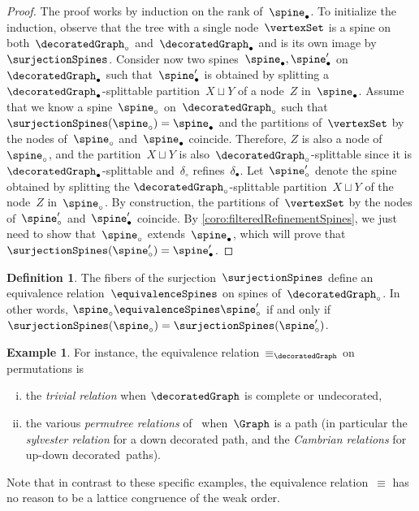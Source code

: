 \documentclass{amsart}
\theoremstyle{definition}
\newtheorem{definition}[theorem]{Definition}
\newtheorem{example}[theorem]{Example}
\newcommand{\darkblue}{\color{darkblue}} %
\newcommand{\defn}[1]{\textsl{\darkblue #1}} %
\newcommand{\vincent}[1]{\todo[color=blue!30]{#1 \\ \hfill --- V.}}
\newcommand{\decoration}{\delta}
\begin{document}
\begin{proof}
  The proof works by induction on the rank of~$\spine_\bullet$.
  To initialize the induction, observe that the tree with a single node~$\vertexSet$ is a spine on both~$\decoratedGraph_\circ$ and~$\decoratedGraph_\bullet$ and is its own image by~$\surjectionSpines$.
  Consider now two spines~$\spine_\bullet, \spine_\bullet'$ on~$\decoratedGraph_\bullet$ such that~$\spine_\bullet'$ is obtained by splitting a $\decoratedGraph_\bullet$-splittable partition~$X \sqcup Y$ of a node~$Z$ in~$\spine_\bullet$.
  Assume that we know a spine~$\spine_\circ$ on~$\decoratedGraph_\circ$ such that~${\surjectionSpines(\spine_\circ) = \spine_\bullet}$ and the partitions of~$\vertexSet$ by the nodes of~$\spine_\circ$ and~$\spine_\bullet$ coincide.
  Therefore, $Z$ is also a node of~$\spine_\circ$, and the partition~$X \sqcup Y$ is also~$\decoratedGraph_\circ$-splittable since it is $\decoratedGraph_\bullet$-splittable and~$\decoration_\circ$ refines~$\decoration_\bullet$.
  Let~$\spine_\circ'$ denote the spine obtained by splitting the  $\decoratedGraph_\circ$-splittable partition~$X \sqcup Y$ of the node~$Z$ in~$\spine_\circ$.
  By construction, the partitions of~$\vertexSet$ by the nodes of~$\spine_\circ'$ and~$\spine_\bullet'$ coincide.
  By \cref{coro:filteredRefinementSpines}, we just need to show that~$\spine_\circ$ extends~$\spine_\bullet$, which will prove that~${\surjectionSpines(\spine_\circ') = \spine_\bullet'}$.
  \vincent{todo}
\end{proof}

\begin{definition}
  \label{def:equivalenceRelation}
  The fibers of the surjection~$\surjectionSpines$ define an equivalence relation~$\equivalenceSpines$ on spines of~$\decoratedGraph_\circ$. In other words, $\spine_\circ \equivalenceSpines \spine_\circ'$ if and only if~$\surjectionSpines(\spine_\circ) = \surjectionSpines(\spine_\circ')$.
\end{definition}

\begin{example}
  \label{exm:equivalenceRelations}
  \vincent{improve}
  For instance, the equivalence relation~$\equiv_{\decoratedGraph}$ on permutations is
  \begin{enumerate}[(i)]
    \item the \defn{trivial relation} when $\decoratedGraph$ is complete or undecorated,
    \item the various \defn{permutree relations} of~\cite{PilaudPons-permutrees} when~$\Graph$ is a path (in particular the \defn{sylvester relation} for a down decorated path, and the \defn{Cambrian relations} for up-down decorated~paths).
  \end{enumerate}
  Note that in contrast to these specific examples, the equivalence relation~$\equiv$ has no reason to be a lattice congruence of the weak order.
\end{example}
\end{document}
